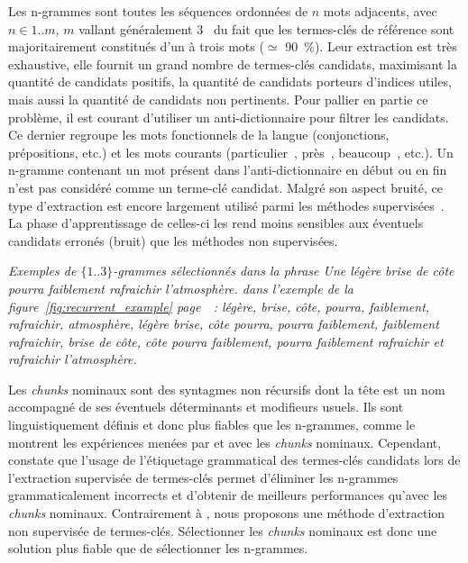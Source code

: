     Les n-grammes sont toutes les séquences ordonnées de $n$ mots adjacents,
    avec $n \in 1..m$, $m$ vallant généralement
    3~\cite{witten1999kea,turney1999learningalgorithms,hulth2003keywordextraction}
    du fait que les termes-clés de référence sont majoritairement constitués
    d'un à trois mots ($\simeq$ 90~\%). Leur extraction est très exhaustive, elle fournit un
    grand nombre de termes-clés candidats, maximisant la quantité de candidats
    positifs, la quantité de candidats porteurs d'indices utiles, mais aussi la
    quantité de candidats non pertinents. Pour pallier en partie ce problème, il
    est courant d'utiliser un anti-dictionnaire pour filtrer les candidats. Ce
    dernier regroupe les mots fonctionnels de la langue (conjonctions,
    prépositions, etc.) et les mots courants (\og particulier~\fg, \og près~\fg,
    \og beaucoup~\fg, etc.). Un n-gramme contenant un mot présent dans
    l'anti-dictionnaire en début ou en fin n'est pas considéré comme un
    terme-clé candidat. Malgré son aspect bruité, ce type d'extraction est
    encore largement utilisé parmi les méthodes
    supervisées~\cite{witten1999kea,turney1999learningalgorithms,hulth2003keywordextraction}.
    La phase d'apprentissage de celles-ci les rend moins sensibles aux éventuels
    candidats erronés (bruit) que les méthodes non supervisées.

    \textit{Exemples de $\{1..3\}$-grammes sélectionnés dans la phrase \og{}Une
    légère brise de côte pourra faiblement rafraichir l'atmosphère.\fg{} dans
    l'exemple de la figure~\ref{fig:recurrent_example}
    page~\pageref{fig:recurrent_example}~: \og{}légère\fg{}, \og{}brise\fg{},
    \og{}côte\fg{}, \og{}pourra\fg{}, \og{}faiblement\fg{},
    \og{}rafraichir\fg{}, \og{}atmosphère\fg{}, \og{}légère brise\fg{},
    \og{}côte pourra\fg{}, \og{}pourra faiblement\fg{}, \og{}faiblement
    rafraichir\fg{}, \og{}brise de côte\fg{}, \og{}côte pourra faiblement\fg{},
    \og{}pourra faiblement rafraichir\fg{} et \og{}rafraichir
    l'atmosphère\fg{}.}

    Les \textit{chunks} nominaux sont des syntagmes non récursifs dont la tête
    est un nom accompagné de ses éventuels déterminants et modifieurs usuels.
    Ils sont linguistiquement définis et donc plus fiables que les n-grammes,
    comme le montrent les expériences menées par
     et  avec les
    \textit{chunks} nominaux. Cependant, 
    constate que l'usage de l'étiquetage grammatical des termes-clés candidats
    lors de l'extraction supervisée de termes-clés permet d'éliminer les
    n-grammes grammaticalement incorrects et d'obtenir de meilleurs performances
    qu'avec les \textit{chunks} nominaux. Contrairement à
    , nous proposons une méthode
    d'extraction non supervisée de termes-clés. Sélectionner les \textit{chunks}
    nominaux est donc une solution plus fiable que de sélectionner les
    n-grammes.

